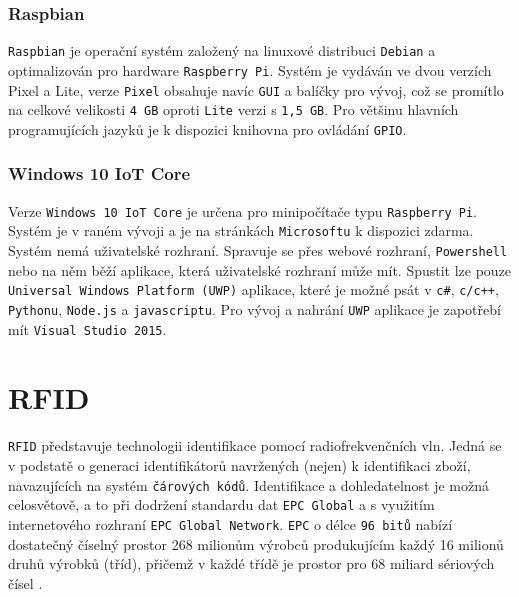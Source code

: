 \documentclass[czech,BP]{thesiskiv}
\begin{document}
			\subsubsection{Raspbian}
				\texttt{Raspbian} je operační systém založený na linuxové distribuci \texttt{Debian} a optimalizován pro hardware \texttt{Raspberry Pi}. Systém je vydáván ve dvou verzích Pixel a Lite, verze \texttt{Pixel} obsahuje navíc \texttt{GUI} a balíčky pro vývoj, což se promítlo na celkové velikosti \texttt{4 GB} oproti \texttt{Lite} verzi s \texttt{1,5 GB}. Pro většinu hlavních programujících jazyků je k dispozici knihovna pro ovládání \texttt{GPIO}.
			
			\subsubsection{Windows 10 IoT Core}
Verze \texttt{Windows 10 IoT Core} je určena pro minipočítače typu \texttt{Raspberry Pi}. Systém je v raném vývoji a je na stránkách \texttt{Microsoftu} k dispozici zdarma. Systém nemá uživatelské rozhraní. Spravuje se přes webové rozhraní, \texttt{Powershell} nebo na něm běží aplikace, která uživatelské rozhraní může mít. Spustit lze pouze \texttt{Universal Windows Platform (UWP)} aplikace, které je možné psát v \texttt{c\#}, \texttt{c/c++}, \texttt{Pythonu}, \texttt{Node.js} a \texttt{javascriptu}. Pro vývoj a nahrání \texttt{UWP} aplikace je zapotřebí mít \texttt{Visual Studio 2015}.
			
\section{RFID}
\texttt{RFID} představuje technologii identifikace pomocí radiofrekvenčních vln. Jedná se v podstatě o generaci identifikátorů navržených (nejen) k identifikaci zboží, navazujících na systém \texttt{čárových kódů}. Identifikace a dohledatelnost je možná celosvětově, a to při dodržení standardu dat \texttt{EPC Global} a s využitím internetového rozhraní \texttt{EPC Global Network}. \texttt{EPC} o délce \texttt{96 bitů} nabízí dostatečný číselný prostor 268 milionům výrobců produkujícím každý 16 milionů druhů výrobků (tříd), přičemž v každé třídě je prostor pro 68 miliard sériových čísel \cite{dolevcek2010identifikace}.
\end{document}
